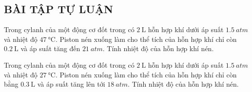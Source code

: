 \subsection{BÀI TẬP TỰ LUẬN}
\setcounter{ex}{0}
\begin{ex}
	Trong cylanh của một động cơ đốt trong có $\SI{2}{\liter}$ hỗn hợp khí dưới áp suất $\SI{1.5}{atm}$ và nhiệt độ $\SI{47}{\celsius}$. Piston nén xuống làm cho thể tích của hỗn hợp khí chỉ còn $\SI{0.2}{\liter}$ và áp suất tăng đến $\SI{21}{atm}$. Tính nhiệt độ của hỗn hợp khí nén.
\end{ex}
\begin{ex}
	Trong cylanh của một động cơ đốt trong có $\SI{2}{\liter}$ hỗn hợp khí dưới áp suất $\SI{1.5}{atm}$ và nhiệt độ $\SI{27}{\celsius}$. Piston nén xuống làm cho thể tích của hỗn hợp khí chỉ còn bằng $\SI{0.3}{\liter}$ và áp suất tăng lên tới $\SI{18}{atm}$. Tính nhiệt độ của hỗn hợp khí nén.
\end{ex}
